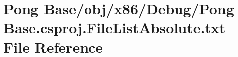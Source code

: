 \hypertarget{_debug_2_pong_01_base_8csproj_8_file_list_absolute_8txt}{\section{Pong Base/obj/x86/\-Debug/\-Pong Base.\-csproj.\-File\-List\-Absolute.\-txt File Reference}
\label{_debug_2_pong_01_base_8csproj_8_file_list_absolute_8txt}
}
